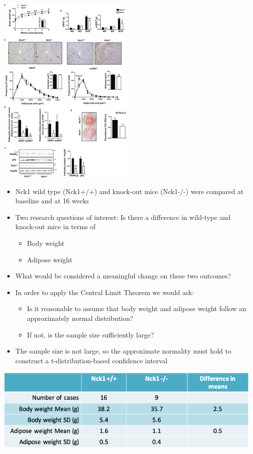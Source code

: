 \documentclass[
]{book}
\providecommand{\tightlist}{%
  \setlength{\itemsep}{0pt}\setlength{\parskip}{0pt}}
\begin{document}
\includegraphics[width=0.5\linewidth]{./3_54}

\begin{itemize}
\tightlist
\item
  Nck1 wild type (Nck1+/+) and knock-out mice (Nck1-/-) were compared at baseline and at 16 weeks
\item
  Two research questions of interest: Is there a difference in wild-type and knock-out mice in terms of

  \begin{itemize}
  \tightlist
  \item
    Body weight
  \item
    Adipose weight
  \end{itemize}
\item
  What would be considered a meaningful change on these two outcomes?
\item
  In order to apply the Central Limit Theorem we would ask:

  \begin{itemize}
  \tightlist
  \item
    Is it reasonable to assume that body weight and adipose weight follow an approximately normal distribution?
  \item
    If not, is the sample size sufficiently large?
  \end{itemize}
\item
  The sample size is not large, so the approximate normality must hold to construct a t-distribution-based confidence interval
\end{itemize}

\includegraphics[width=1\linewidth]{./3_55}
\end{document}
